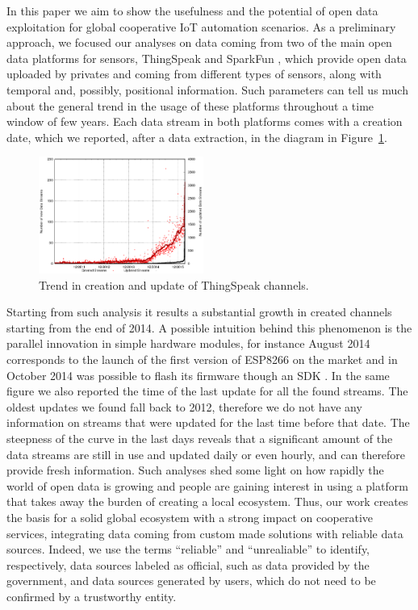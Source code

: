 In this paper we aim to show the usefulness and the potential of open data exploitation for global cooperative IoT automation scenarios.
As a preliminary approach, we focused our analyses on data coming from two of the main open data platforms for sensors, ThingSpeak \cite{thingspeak} and SparkFun \cite{sparkfun}, which provide open data uploaded by privates and coming from different types of sensors, along with temporal and, possibly, positional information.
Such parameters can tell us much about the general trend in the usage of these platforms throughout a time window of few years.
Each data stream in both platforms comes with a creation date, which we reported, after a data extraction, in the diagram in Figure~\ref{creationtrend}.

\begin{figure}[btp]
\centering
\includegraphics[width=0.48\textwidth]{img/bars.eps} 
\caption{Trend in creation and update of ThingSpeak channels.}
\label{creationtrend}
\end{figure}

Starting from such analysis it results a substantial growth in created channels starting from the end of 2014. 
A possible intuition behind this phenomenon is the parallel innovation in simple hardware modules, for instance August 2014 corresponds to the launch of the first version of ESP8266 \cite{esp8266} on the market and in October 2014 was possible to flash its firmware though an SDK \cite{espressif}.
In the same figure we also reported the time of the last update for all the found streams.
The oldest updates we found fall back to 2012, therefore we do not have any information on streams that were updated for the last time before that date.
The steepness of the curve in the last days reveals that a significant amount of the data streams are still in use and updated daily or even hourly, and can therefore provide fresh information.
Such analyses shed some light on how rapidly the world of open data is growing and people are gaining interest in using a platform that takes away the burden of creating a local ecosystem.
Thus, our work creates the basis for a solid global ecosystem with a strong impact on cooperative services, integrating data coming from custom made solutions with reliable data sources.
Indeed, we use the terms ``reliable'' and ``unrealiable'' to identify, respectively, data sources labeled as official, such as data provided by the government, and data sources generated by users, which do not need to be confirmed by a trustworthy entity. 

